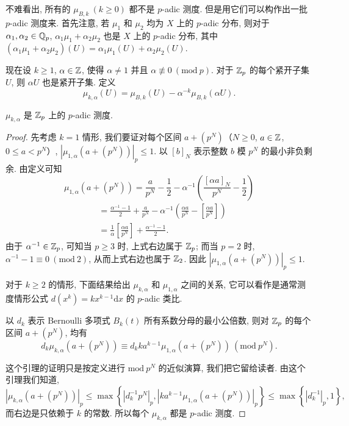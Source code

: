 不难看出, 所有的 $\mu_{B,k}\ (k\geqslant 0)$ 都不是 $p$-adic 测度. 但是用它们可以构作出一批 $p$-adic 测度来. 首先注意, 若 $\mu_1$ 和 $\mu_2$ 均为 $X$ 上的 $p$-adic 分布, 则对于 $\alpha_1,\alpha_2\in\mathbb{Q}_p$, $\alpha_1\mu_1+\alpha_2\mu_2$ 也是 $X$ 上的 $p$-adic 分布, 其中 $(\alpha_1\mu_1+\alpha_2\mu_2)(U)=\alpha_1\mu_1(U)+\alpha_2\mu_2(U)$.

现在设 $k\geqslant 1$, $\alpha\in\mathbb{Z}$, 使得 $\alpha\neq 1$ 并且 $\alpha\not\equiv 0\ (\mathrm{mod}\ p)$. 对于 $\mathbb{Z}_p$ 的每个紧开子集 $U$, 则 $\alpha U$ 也是紧开子集. 定义
\begin{equation}\tag{9}
  \mu_{k,\alpha}(U)=\mu_{B,k}(U)-\alpha^{-k}\mu_{B,k}(\alpha U).
\end{equation}

\begin{theorem}\label{thm:9.20}
$\mu_{k,\alpha}$ 是 $\mathbb{Z}_p$ 上的 $p$-adic 测度.
\end{theorem}

\begin{proof}
先考虑 $k=1$ 情形, 我们要证对每个区间 $a+(p^N)$（$N\geqslant 0$, $a\in\mathbb{Z}$, $0\leqslant a<p^N$）, $\left|\mu_{1,\alpha}(a+(p^N))\right|_p\leqslant 1$. 以 $[b]_N$ 表示整数 $b$ 模 $p^N$ 的最小非负剩余. 由定义可知
\[
  \mu_{1,\alpha}(a+(p^N))
  =\frac{a}{p^N}-\frac{1}{2}-\alpha^{-1}\left(\frac{[\alpha a]_N}{p^N}-\frac{1}{2}\right)
\]
\[
  \begin{aligned}
    &=\frac{\alpha^{-1}-1}{2}+\frac{a}{p^N}
    -\alpha^{-1}\left(\frac{\alpha a}{p^N}-\left[\frac{\alpha a}{p^N}\right]\right)\\
    &=\frac{1}{\alpha}\left[\frac{\alpha a}{p^N}\right]+\frac{\alpha^{-1}-1}{2}.
  \end{aligned}
\]
由于 $\alpha^{-1}\in\mathbb{Z}_p$, 可知当 $p\geqslant 3$ 时, 上式右边属于 $\mathbb{Z}_p$; 而当 $p=2$ 时, $\alpha^{-1}-1\equiv 0\ (\mathrm{mod}\ 2)$, 从而上式右边也属于 $\mathbb{Z}_2$. 因此 $\left|\mu_{1,\alpha}(a+(p^N))\right|_p\leqslant 1$.

对于 $k\geqslant 2$ 的情形, 下面结果给出 $\mu_{k,\alpha}$ 和 $\mu_{1,\alpha}$ 之间的关系, 它可以看作是通常测度情形公式 $d(x^k)=kx^{k-1}\mathrm{d}x$ 的 $p$-adic 类比.

\begin{lemma}\label{lem:ch9-8}
以 $d_k$ 表示 Bernoulli 多项式 $B_k(t)$ 所有系数分母的最小公倍数, 则对 $\mathbb{Z}_p$ 的每个区间 $a+(p^N)$, 均有
\[
  d_k\mu_{k,\alpha}(a+(p^N))
  \equiv d_kka^{k-1}\mu_{1,\alpha}(a+(p^N))\ (\mathrm{mod}\ p^N).
\]
\end{lemma}

这个引理的证明只是按定义进行 $\mathrm{mod}\ p^N$ 的近似演算, 我们把它留给读者. 由这个引理我们知道,
\[
  \left|\mu_{k,\alpha}(a+(p^N))\right|_p
  \leqslant\max\left\{\left|d_k^{-1}p^N\right|_p,
  \left|ka^{k-1}\mu_{1,\alpha}(a+(p^N))\right|_p\right\}
  \leqslant\max\left\{\left|d_k^{-1}\right|_p,1\right\},
\]
而右边是只依赖于 $k$ 的常数. 所以每个 $\mu_{k,\alpha}$ 都是 $p$-adic 测度.
\end{proof}

